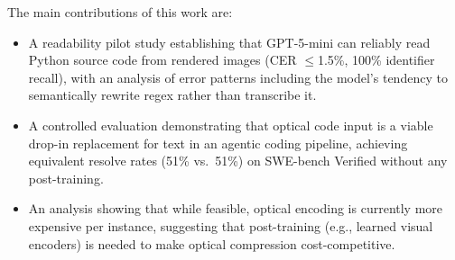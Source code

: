 The main contributions of this work are:
\begin{itemize}[leftmargin=*]
  \item A readability pilot study establishing that GPT-5-mini can reliably read Python source code from rendered images (CER $\le$1.5\%, 100\% identifier recall), with an analysis of error patterns including the model's tendency to semantically rewrite regex rather than transcribe it.
  \item A controlled evaluation demonstrating that optical code input is a viable drop-in replacement for text in an agentic coding pipeline, achieving equivalent resolve rates (51\% vs.\ 51\%) on SWE-bench Verified without any post-training.
  \item An analysis showing that while feasible, optical encoding is currently more expensive per instance, suggesting that post-training (e.g., learned visual encoders) is needed to make optical compression cost-competitive.
\end{itemize}
